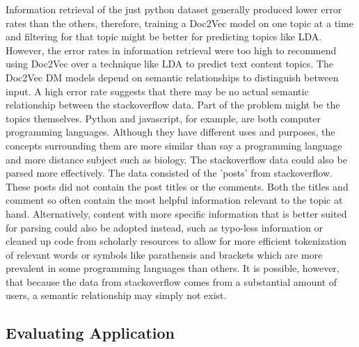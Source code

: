 Information retrieval of the just python dataset generally produced lower error rates than the others, therefore, training a Doc2Vec model on one topic at a time and filtering for that topic might be better for predicting topics like LDA. However, the error rates in information retrieval were too high to recommend using Doc2Vec over a technique like LDA to predict text content topics. The Doc2Vec DM models depend on semantic relationships to distinguish between input. A high error rate suggests that there may be no actual semantic relationship between the stackoverflow data. Part of the problem might be the topics themselves. Python and javascript, for example, are both computer programming languages. Although they have different uses and purposes, the concepts surrounding them are more similar than say a programming language and more distance subject such as biology. The stackoverflow data could also be parsed more effectively. The data consisted of the 'posts' from stackoverflow. These posts did not contain the post titles or the comments. Both the titles and comment so often contain the most helpful information relevant to the topic at hand. Alternatively, content with more specific information that is better suited for parsing could also be adopted instead, such as typo-less information or cleaned up code from scholarly resources to allow for more efficient tokenization of relevant words or symbols like parathensis and brackets which are more prevalent in some programming languages than others. It is possible, however, that because the data from stackoverflow comes from a substantial amount of users, a semantic relationship may simply not exist. 

\subsection{Evaluating Application}
